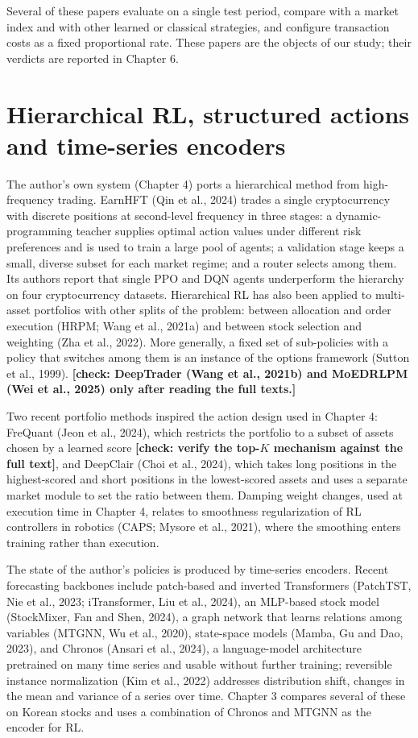 \documentclass[12pt,a4paper]{report}
\begin{document}
Several of these papers evaluate on a single test period, compare with a
market index and with other learned or classical strategies, and
configure transaction costs as a fixed proportional rate. These papers
are the objects of our study; their verdicts are reported in Chapter 6.

\section{Hierarchical RL, structured actions and time-series
encoders}\label{hierarchical-rl-structured-actions-and-time-series-encoders}

The author's own system (Chapter 4) ports a hierarchical method from
high-frequency trading. EarnHFT (Qin et al., 2024) trades a single
cryptocurrency with discrete positions at second-level frequency in
three stages: a dynamic-programming teacher supplies optimal action
values under different risk preferences and is used to train a large
pool of agents; a validation stage keeps a small, diverse subset for
each market regime; and a router selects among them. Its authors report
that single PPO and DQN agents underperform the hierarchy on four
cryptocurrency datasets. Hierarchical RL has also been applied to
multi-asset portfolios with other splits of the problem: between
allocation and order execution (HRPM; Wang et al., 2021a) and between
stock selection and weighting (Zha et al., 2022). More generally, a
fixed set of sub-policies with a policy that switches among them is an
instance of the options framework (Sutton et al., 1999).
\textbf{{[}check: DeepTrader (Wang et al., 2021b) and MoEDRLPM (Wei et
al., 2025) only after reading the full texts.{]}}

Two recent portfolio methods inspired the action design used in Chapter
4: FreQuant (Jeon et al., 2024), which restricts the portfolio to a
subset of assets chosen by a learned score \textbf{{[}check: verify the
top-\(K\) mechanism against the full text{]}}, and DeepClair (Choi et
al., 2024), which takes long positions in the highest-scored and short
positions in the lowest-scored assets and uses a separate market module
to set the ratio between them. Damping weight changes, used at execution
time in Chapter 4, relates to smoothness regularization of RL
controllers in robotics (CAPS; Mysore et al., 2021), where the smoothing
enters training rather than execution.

The state of the author's policies is produced by time-series encoders.
Recent forecasting backbones include patch-based and inverted
Transformers (PatchTST, Nie et al., 2023; iTransformer, Liu et al.,
2024), an MLP-based stock model (StockMixer, Fan and Shen, 2024), a
graph network that learns relations among variables (MTGNN, Wu et al.,
2020), state-space models (Mamba, Gu and Dao, 2023), and Chronos (Ansari
et al., 2024), a language-model architecture pretrained on many time
series and usable without further training; reversible instance
normalization (Kim et al., 2022) addresses distribution shift, changes
in the mean and variance of a series over time. Chapter 3 compares
several of these on Korean stocks and uses a combination of Chronos and
MTGNN as the encoder for RL.
\end{document}

